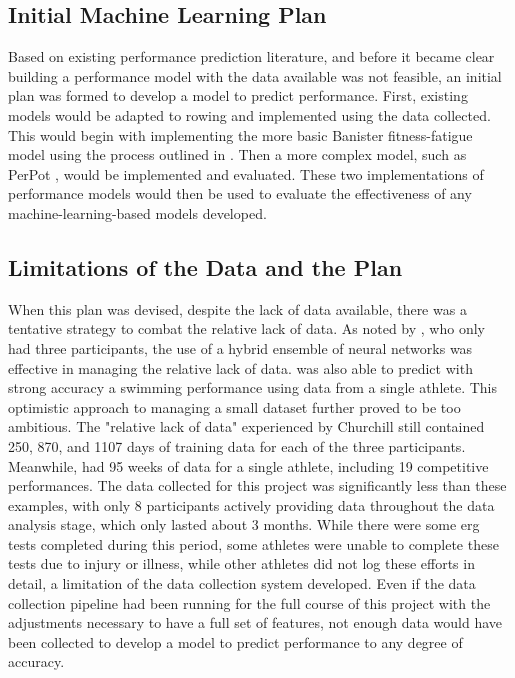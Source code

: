\subsection{Initial Machine Learning Plan}
Based on existing performance prediction literature, and before it became clear building a performance model with the data available was not feasible, an initial plan was formed to develop a model to predict performance. First, existing models would be adapted to rowing and implemented using the data collected. This would begin with implementing the more basic Banister fitness-fatigue model using the process outlined in \textcite{Morton1990}. Then a more complex model, such as PerPot \cite{perl2001}, would be implemented and evaluated. These two implementations of performance models would then be used to evaluate the effectiveness of any machine-learning-based models developed.

\subsection{Limitations of the Data and the Plan}
When this plan was devised, despite the lack of data available, there was a tentative strategy to combat the relative lack of data. As noted by \textcite{Churchill2014}, who only had three participants, the use of a hybrid ensemble of neural networks was effective in managing the relative lack of data. \textcite{Edelmannnusser2002} was also able to predict with strong accuracy a swimming performance using data from a single athlete. This optimistic approach to managing a small dataset further proved to be too ambitious. The "relative lack of data" experienced by Churchill still contained 250, 870, and 1107 days of training data for each of the three participants. Meanwhile, \textcite{Edelmannnusser2002} had 95 weeks of data for a single athlete, including 19 competitive performances. The data collected for this project was significantly less than these examples, with only 8 participants actively providing data throughout the data analysis stage, which only lasted about 3 months. While there were some erg tests completed during this period, some athletes were unable to complete these tests due to injury or illness, while other athletes did not log these efforts in detail, a limitation of the data collection system developed. Even if the data collection pipeline had been running for the full course of this project with the adjustments necessary to have a full set of features, not enough data would have been collected to develop a model to predict performance to any degree of accuracy.


